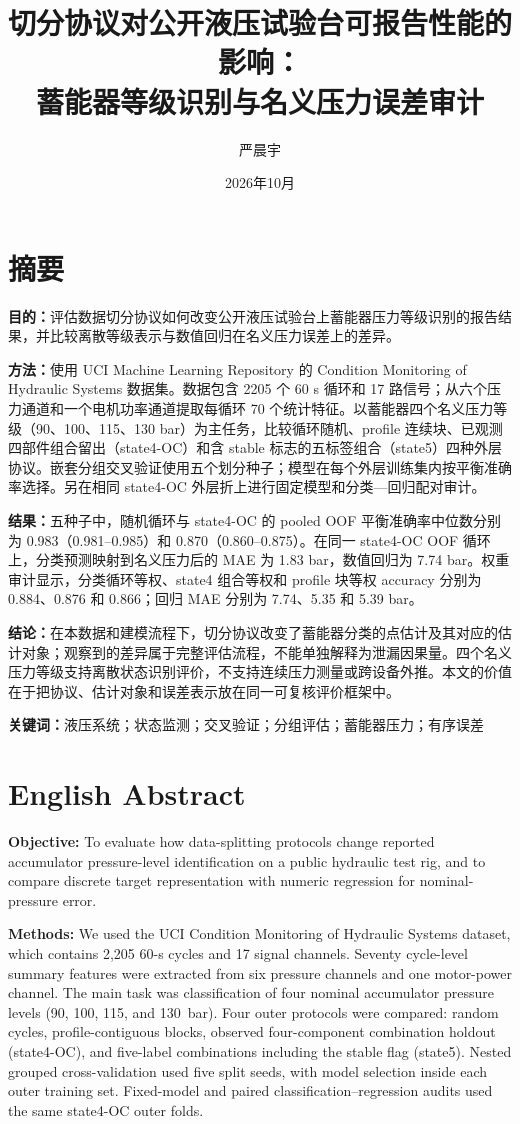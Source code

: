 \documentclass[UTF8,12pt,a4paper]{ctexart}
\title{切分协议对公开液压试验台可报告性能的影响：\\蓄能器等级识别与名义压力误差审计}
\author{严晨宇}
\date{2026年10月}
\begin{document}
\maketitle

\section*{摘要}
\textbf{目的：}评估数据切分协议如何改变公开液压试验台上蓄能器压力等级识别的报告结果，并比较离散等级表示与数值回归在名义压力误差上的差异。

\textbf{方法：}使用 UCI Machine Learning Repository 的 Condition Monitoring of Hydraulic Systems 数据集。数据包含 2205 个 60 s 循环和 17 路信号；从六个压力通道和一个电机功率通道提取每循环 70 个统计特征。以蓄能器四个名义压力等级（90、100、115、130 bar）为主任务，比较循环随机、profile 连续块、已观测四部件组合留出（state4-OC）和含 stable 标志的五标签组合（state5）四种外层协议。嵌套分组交叉验证使用五个划分种子；模型在每个外层训练集内按平衡准确率选择。另在相同 state4-OC 外层折上进行固定模型和分类—回归配对审计。

\textbf{结果：}五种子中，随机循环与 state4-OC 的 pooled OOF 平衡准确率中位数分别为 0.983（0.981–0.985）和 0.870（0.860–0.875）。在同一 state4-OC OOF 循环上，分类预测映射到名义压力后的 MAE 为 1.83 bar，数值回归为 7.74 bar。权重审计显示，分类循环等权、state4 组合等权和 profile 块等权 accuracy 分别为 0.884、0.876 和 0.866；回归 MAE 分别为 7.74、5.35 和 5.39 bar。

\textbf{结论：}在本数据和建模流程下，切分协议改变了蓄能器分类的点估计及其对应的估计对象；观察到的差异属于完整评估流程，不能单独解释为泄漏因果量。四个名义压力等级支持离散状态识别评价，不支持连续压力测量或跨设备外推。本文的价值在于把协议、估计对象和误差表示放在同一可复核评价框架中。

\textbf{关键词：}液压系统；状态监测；交叉验证；分组评估；蓄能器压力；有序误差

\section*{English Abstract}
\sloppy
\textbf{Objective:} To evaluate how data-splitting protocols change reported accumulator pressure-level identification on a public hydraulic test rig, and to compare discrete target representation with numeric regression for nominal-pressure error.

\textbf{Methods:} We used the UCI Condition Monitoring of Hydraulic Systems dataset, which contains 2,205 60-s cycles and 17 signal channels. Seventy cycle-level summary features were extracted from six pressure channels and one motor-power channel. The main task was classification of four nominal accumulator pressure levels (90, 100, 115, and 130~bar). Four outer protocols were compared: random cycles, profile-contiguous blocks, observed four-component combination holdout (state4-OC), and five-label combinations including the stable flag (state5). Nested grouped cross-validation used five split seeds, with model selection inside each outer training set. Fixed-model and paired classification--regression audits used the same state4-OC outer folds.
\end{document}
